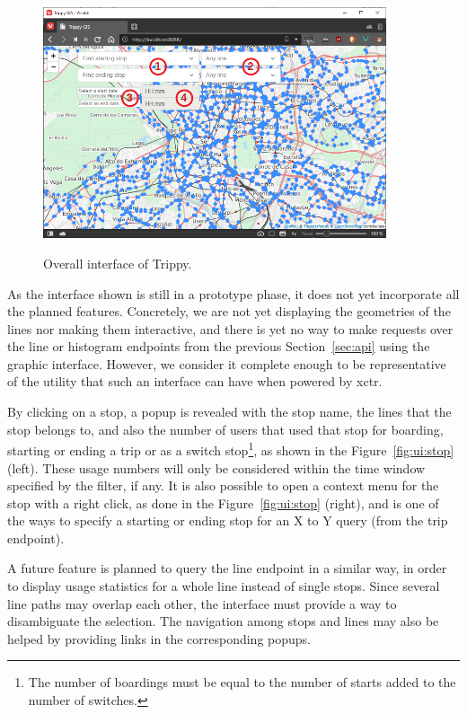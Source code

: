     \begin{figure}[ht]
		\begin{center}
			{\includegraphics[width=0.9\textwidth]{screens/overall.png}}
		\end{center}
		\caption{Overall interface of Trippy.}
		\label{fig:ui:overall}
	\end{figure}
	
	As the interface shown is still in a prototype phase, it does not yet incorporate all the planned features. Concretely, we are not yet displaying the geometries of the lines nor making them interactive, and there is yet no way to make requests over the line or histogram endpoints from the previous Section~\ref{sec:api} using the graphic interface. However, we consider it complete enough to be representative of the utility that such an interface can have when powered by \gls{xctr}.
	
	By clicking on a stop, a popup is revealed with the stop name, the lines that the stop belongs to, and also the number of users that used that stop for boarding, starting or ending a trip or as a switch stop\footnote{The number of boardings must be equal to the number of starts added to the number of switches.}, as shown in the Figure~\ref{fig:ui:stop} (left). These usage numbers will only be considered within the time window specified by the filter, if any. It is also possible to open a context menu for the stop with a right click, as done in the Figure~\ref{fig:ui:stop} (right), and is one of the ways to specify a starting or ending stop for an X to Y query (from the trip endpoint).
	
	A future feature is planned to query the line endpoint in a similar way, in order to display usage statistics for a whole line instead of single stops. Since several line paths may overlap each other, the interface must provide a way to disambiguate the selection. The navigation among stops and lines may also be helped by providing links in the corresponding popups.
	
